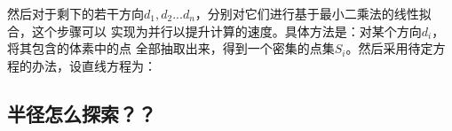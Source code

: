 然后对于剩下的若干方向$d_1,d_2...d_n$，分别对它们进行基于最小二乘法的线性拟合，这个步骤可以
实现为并行以提升计算的速度。具体方法是：对某个方向$d_i$，将其包含的体素中的点
全部抽取出来，得到一个密集的点集$S_i$。然后采用待定方程的办法，设直线方程为：
%
%

\subsection{半径怎么探索？？}

